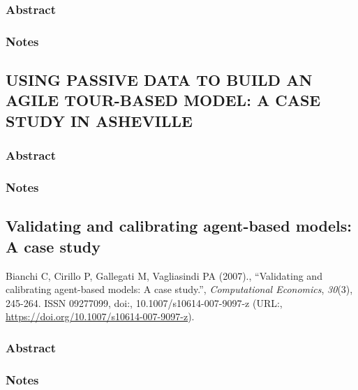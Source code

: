 \documentclass[]{article}
\begin{document}
\hypertarget{abstract-9}{%
\subsubsection{Abstract}\label{abstract-9}}

\hypertarget{notes-9}{%
\subsubsection{Notes}\label{notes-9}}

\hypertarget{using-passive-data-to-build-an-agile-tour-based-model-a-case-study-in-asheville}{%
\subsection{USING PASSIVE DATA TO BUILD AN AGILE TOUR-BASED MODEL: A
CASE STUDY IN
ASHEVILLE}\label{using-passive-data-to-build-an-agile-tour-based-model-a-case-study-in-asheville}}

\hypertarget{abstract-10}{%
\subsubsection{Abstract}\label{abstract-10}}

\hypertarget{notes-10}{%
\subsubsection{Notes}\label{notes-10}}

\hypertarget{validating-and-calibrating-agent-based-models-a-case-study}{%
\subsection{Validating and calibrating agent-based models: A case
study}\label{validating-and-calibrating-agent-based-models-a-case-study}}

Bianchi C, Cirillo P, Gallegati M, Vagliasindi PA (2007)., ``Validating
and calibrating agent-based models: A case study.'', \emph{Computational
Economics}, \emph{30}(3), 245-264. ISSN 09277099, doi:,
10.1007/s10614-007-9097-z (URL:,
\url{https://doi.org/10.1007/s10614-007-9097-z}).

\hypertarget{abstract-11}{%
\subsubsection{Abstract}\label{abstract-11}}

\hypertarget{notes-11}{%
\subsubsection{Notes}\label{notes-11}}
\end{document}
